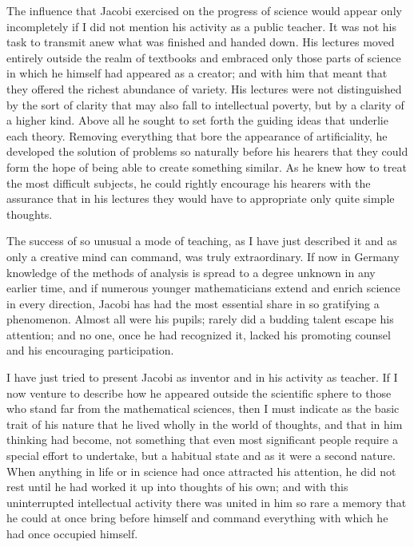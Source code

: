 \documentclass[11pt]{article}
\begin{document}
The influence that Jacobi exercised on the progress of science would appear only incompletely if I did not mention his activity as a public teacher. It was not his task to transmit anew what was finished and handed down. His lectures moved entirely outside the realm of textbooks and embraced only those parts of science in which he himself had appeared as a creator; and with him that meant that they offered the richest abundance of variety. His lectures were not distinguished by the sort of clarity that may also fall to intellectual poverty, but by a clarity of a higher kind. Above all he sought to set forth the guiding ideas that underlie each theory. Removing everything that bore the appearance of artificiality, he developed the solution of problems so naturally before his hearers that they could form the hope of being able to create something similar. As he knew how to treat the most difficult subjects, he could rightly encourage his hearers with the assurance that in his lectures they would have to appropriate only quite simple thoughts.

The success of so unusual a mode of teaching, as I have just described it and as only a creative mind can command, was truly extraordinary. If now in Germany knowledge of the methods of analysis is spread to a degree unknown in any earlier time, and if numerous younger mathematicians extend and enrich science in every direction, Jacobi has had the most essential share in so gratifying a phenomenon. Almost all were his pupils; rarely did a budding talent escape his attention; and no one, once he had recognized it, lacked his promoting counsel and his encouraging participation.

I have just tried to present Jacobi as inventor and in his activity as teacher. If I now venture to describe how he appeared outside the scientific sphere to those who stand far from the mathematical sciences, then I must indicate as the basic trait of his nature that he lived wholly in the world of thoughts, and that in him thinking had become, not something that even most significant people require a special effort to undertake, but a habitual state and as it were a second nature. When anything in life or in science had once attracted his attention, he did not rest until he had worked it up into thoughts of his own; and with this uninterrupted intellectual activity there was united in him so rare a memory that he could at once bring before himself and command everything with which he had once occupied himself.
\end{document}
